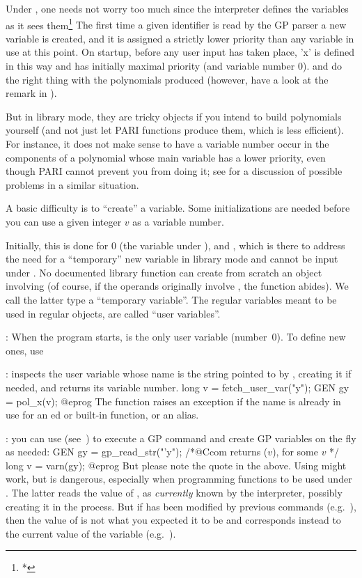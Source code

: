 Under , one needs not worry too much since the interpreter defines
the variables as it sees them\footnote{*}{ The first time a given identifier
is read by the GP parser a new variable is created, and it is assigned a
strictly lower priority than any variable in use at this point. On startup,
before any user input has taken place, 'x' is defined in this way and has
initially maximal priority (and variable number $0$).}
%
and do the right thing with the polynomials produced (however, have a look at
the remark in ).

But in library mode, they are tricky objects if you intend to build
polynomials yourself (and not just let PARI functions produce them, which is
less efficient). For instance, it does not make sense to have a variable
number occur in the components of a polynomial whose main variable has a
lower priority, even though PARI cannot prevent you from doing it; see
 for a discussion of possible problems in a similar
situation.

 A basic difficulty is to ``create'' a variable.
Some initializations are needed before you can use a given integer $v$ as a
variable number.

Initially, this is done for $0$ (the variable  under ), and
, which is there to address the need for a ``temporary'' new
variable in library mode and cannot be input under . No documented
library function can create from scratch an object involving 
(of course, if the operands originally involve , the function
abides). We call the latter type a ``temporary variable''. The regular
variables meant to be used in regular objects, are called ``user
variables''.

: When the program starts,
 is the only user variable (number~$0$). To define new ones, use

: inspects the user variable whose name is
the string pointed to by , creating it if needed, and returns its
variable number.
\bprog
long v = fetch_user_var("y");
GEN gy = pol_x(v);
@eprog\noindent
The function raises an exception if the name is already in use for an
ed or built-in function, or an alias.

: you can use 
(see~) to execute a GP command and create GP
variables on the fly as needed:
\bprog
GEN gy = gp_read_str("'y"); /*@Ccom returns ($v$), for some $v$ */
long v = varn(gy);
@eprog\noindent
But please note the quote  in the above. Using 
might work, but is dangerous, especially when programming functions to
be used under . The latter reads the value of , as
\emph{currently} known by the  interpreter, possibly creating it
in the process. But if  has been modified by previous 
commands (e.g.~), then the value of  is not what you
expected it to be and corresponds instead to the current value of the
 variable (e.g.~).

